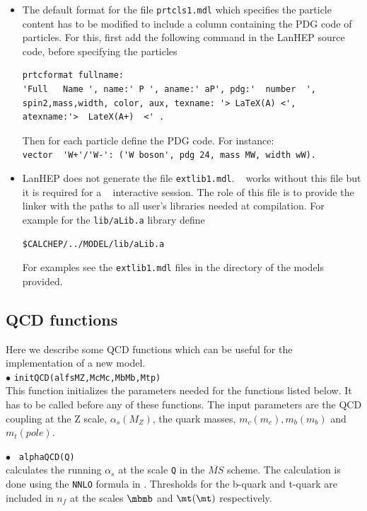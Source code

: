 \documentclass[12pt,a4paper]{article}
\begin{document}
{\begin{itemize}
\item The default format for the file \verb|prtcls1.mdl| which specifies the particle content has to be
modified to include a column containing the PDG code of particles. 
For this, first add the following command in the LanHEP source code, before specifying the particles  
\begin{verbatim}
prtcformat fullname:
'Full   Name ', name:' P ', aname:' aP', pdg:'  number  ',
spin2,mass,width, color, aux, texname: '> LaTeX(A) <',
atexname:'>  LateX(A+)  <' .
\end{verbatim}

Then for each particle  define the PDG code. For
instance:\\
\verb|vector  'W+'/'W-': ('W boson', pdg 24, mass MW, width wW).|\\




\item LanHEP does not generate the  file \verb|extlib1.mdl|.
\micro~ works without  this file but it is required for a \calchep~ interactive session. 
The role of this file is to provide the linker with the paths to all user's libraries
needed at compilation. For example for the \verb|lib/aLib.a| library define
\begin{verbatim}
$CALCHEP/../MODEL/lib/aLib.a
\end{verbatim}
For  examples see the \verb|extlib1.mdl| files in the  directory of the models provided.  

\end{itemize}

\subsection{QCD functions}
Here we describe some QCD functions which can be useful for the implementation of a new model.\\
\noindent$\bullet$ \verb|initQCD(alfsMZ,McMc,MbMb,Mtp)|\\
This function initializes the parameters needed for the functions
listed below. It has to be called before any of these functions.
The input parameters are the QCD coupling at the Z scale,
$\alpha_s(M_Z)$, the quark masses, $m_c(m_c), m_b(m_b)$ and
$m_t(pole)$.

\noindent$\bullet$ \verb| alphaQCD(Q)|\\
calculates the  running $\alpha_s$ at the scale \verb|Q| in the
$\overline{MS}$ scheme. The calculation is done using the
\verb|NNLO| formula in \cite{Eidelman:2004wy}. Thresholds for the 
b-quark and t-quark  are included in  $n_f$ at the scales $\mbmb$
and $\mt(\mt)$ respectively.

}
\end{document}
